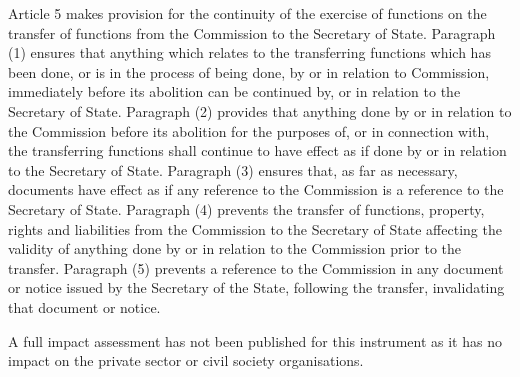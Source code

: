 \documentclass[12pt,a4paper]{article}
\begin{document}
Article 5 makes provision for the continuity of the exercise of functions on the transfer of functions from the Commission to the Secretary of State. Paragraph (1) ensures that anything which relates to the transferring functions which has been done, or is in the process of being done, by or in relation to Commission, immediately before its abolition can be continued by, or in relation to the Secretary of State. Paragraph (2) provides that anything done by or in relation to the Commission before its abolition for the purposes of, or in connection with, the transferring functions shall continue to have effect as if done by or in relation to the Secretary of State. Paragraph (3) ensures that, as far as necessary, documents have effect as if any reference to the Commission is a reference to the Secretary of State. Paragraph (4) prevents the transfer of functions, property, rights and liabilities from the Commission to the Secretary of State affecting the validity of anything done by or in relation to the Commission prior to the transfer. Paragraph (5) prevents a reference to the Commission in any document or notice issued by the Secretary of the State, following the transfer, invalidating that document or notice.

A full impact assessment has not been published for this instrument as it has no impact on the private sector or civil society organisations. 
\end{document}
